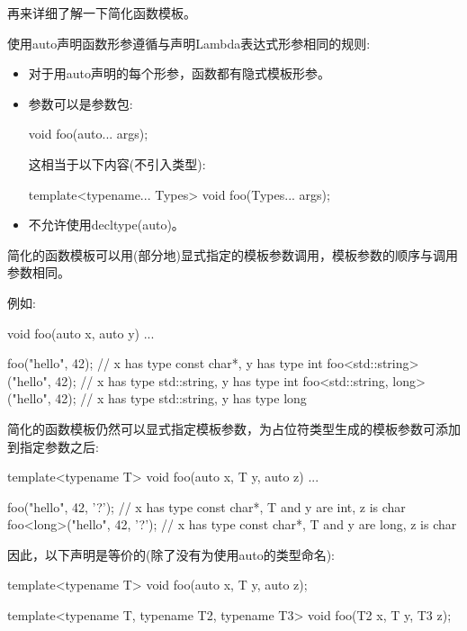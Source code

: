 
再来详细了解一下简化函数模板。


使用auto声明函数形参遵循与声明Lambda表达式形参相同的规则:

\begin{itemize}
\item
对于用auto声明的每个形参，函数都有隐式模板形参。

\item
参数可以是参数包:
\begin{cpp}
void foo(auto... args);
\end{cpp}

这相当于以下内容(不引入类型):
\begin{cpp}
template<typename... Types>
void foo(Types... args);
\end{cpp}

\item
不允许使用decltype(auto)。
\end{itemize}

简化的函数模板可以用(部分地)显式指定的模板参数调用，模板参数的顺序与调用参数相同。

例如:

\begin{cpp}
void foo(auto x, auto y)
{
	...
}

foo("hello", 42); // x has type const char*, y has type int
foo<std::string>("hello", 42); // x has type std::string, y has type int
foo<std::string, long>("hello", 42); // x has type std::string, y has type long
\end{cpp}


简化的函数模板仍然可以显式指定模板参数，为占位符类型生成的模板参数可添加到指定参数之后:

\begin{cpp}
template<typename T>
void foo(auto x, T y, auto z)
{
	...
}

foo("hello", 42, '?'); // x has type const char*, T and y are int, z is char
foo<long>("hello", 42, '?'); // x has type const char*, T and y are long, z is char
\end{cpp}

因此，以下声明是等价的(除了没有为使用auto的类型命名):

\begin{cpp}
template<typename T>
void foo(auto x, T y, auto z);

template<typename T, typename T2, typename T3>
void foo(T2 x, T y, T3 z);
\end{cpp}

